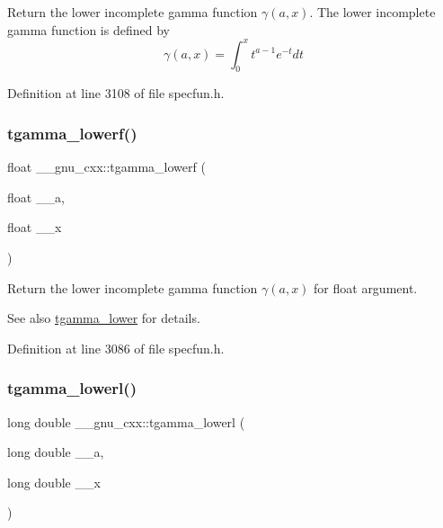 Return the lower incomplete gamma function $ \gamma(a,x) $. The lower incomplete gamma function is defined by \[ \gamma(a,x) = \int_0^x t^{a-1}e^{-t}dt \] 

Definition at line 3108 of file specfun.\+h.

\mbox{\label{group__gnu__math__spec__func_ga8f2aabeaa29d21b19c43972efb26798c}} 
\subsubsection{\texorpdfstring{tgamma\+\_\+lowerf()}{tgamma\_lowerf()}}
{\footnotesize\ttfamily float \+\_\+\+\_\+gnu\+\_\+cxx\+::tgamma\+\_\+lowerf (\begin{DoxyParamCaption}\item[{float}]{\+\_\+\+\_\+a,  }\item[{float}]{\+\_\+\+\_\+x }\end{DoxyParamCaption})\hspace{0.3cm}{\ttfamily [inline]}}

Return the lower incomplete gamma function $ \gamma(a,x) $ for {\ttfamily float} argument.

\begin{DoxySeeAlso}{See also}
\hyperlink{group__gnu__math__spec__func_gaed107908dec8865ea48e7764f7ea88a2}{tgamma\+\_\+lower} for details. 
\end{DoxySeeAlso}


Definition at line 3086 of file specfun.\+h.

\mbox{\label{group__gnu__math__spec__func_gad057fe49a5bf95b1550f5f0a6e60bb19}} 
\subsubsection{\texorpdfstring{tgamma\+\_\+lowerl()}{tgamma\_lowerl()}}
{\footnotesize\ttfamily long double \+\_\+\+\_\+gnu\+\_\+cxx\+::tgamma\+\_\+lowerl (\begin{DoxyParamCaption}\item[{long double}]{\+\_\+\+\_\+a,  }\item[{long double}]{\+\_\+\+\_\+x }\end{DoxyParamCaption})\hspace{0.3cm}{\ttfamily [inline]}}

